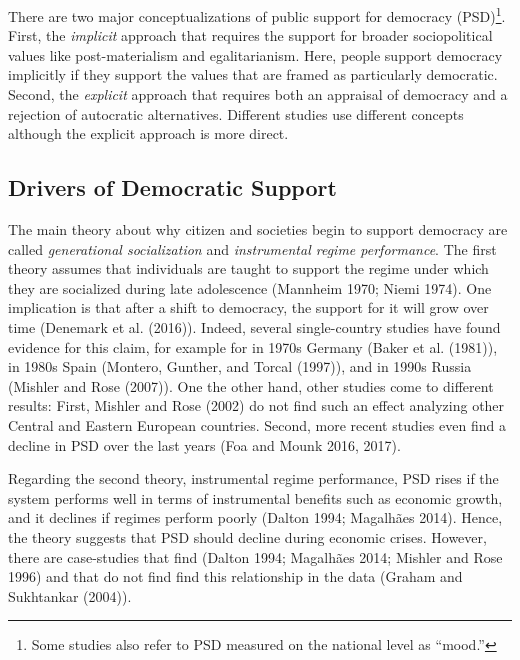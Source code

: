 \documentclass[12pt,english,a4paper,oneside]{article}
\theoremstyle{definition}
\theoremstyle{definition}
\theoremstyle{definition}
\theoremstyle{definition}
\theoremstyle{remark}
\begin{document}
There are two major conceptualizations of public support for democracy (PSD)\footnote{Some studies also refer to PSD measured on the national level as \enquote{mood.}}. First, the \emph{implicit} approach that requires the support for broader sociopolitical values like post-materialism and egalitarianism. Here, people support democracy implicitly if they support the values that are framed as particularly democratic. Second, the \emph{explicit} approach that requires both an appraisal of democracy and a rejection of autocratic alternatives. Different studies use different concepts although the explicit approach is more direct.

\hypertarget{drivers-of-democratic-support}{%
\subsection{Drivers of Democratic Support}\label{drivers-of-democratic-support}}

The main theory about why citizen and societies begin to support democracy are called \emph{generational socialization} and \emph{instrumental regime performance}. The first theory assumes that individuals are taught to support the regime under which they are socialized during late adolescence (Mannheim 1970; Niemi 1974). One implication is that after a shift to democracy, the support for it will grow over time (Denemark et al. (2016)). Indeed, several single-country studies have found evidence for this claim, for example for in 1970s Germany (Baker et al. (1981)), in 1980s Spain (Montero, Gunther, and Torcal (1997)), and in 1990s Russia (Mishler and Rose (2007)). One the other hand, other studies come to different results: First, Mishler and Rose (2002) do not find such an effect analyzing other Central and Eastern European countries. Second, more recent studies even find a decline in PSD over the last years (Foa and Mounk 2016, 2017).

Regarding the second theory, instrumental regime performance, PSD rises if the system performs well in terms of instrumental benefits such as economic growth, and it declines if regimes perform poorly (Dalton 1994; Magalhães 2014). Hence, the theory suggests that PSD should decline during economic crises. However, there are case-studies that find (Dalton 1994; Magalhães 2014; Mishler and Rose 1996) and that do not find find this relationship in the data (Graham and Sukhtankar (2004)).
\end{document}
